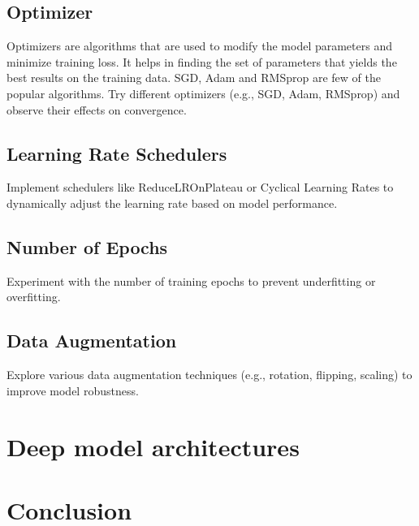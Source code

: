 \documentclass[10pt,twocolumn,letterpaper]{article}
\begin{document}


\subsection{Optimizer}


Optimizers are algorithms that are used to modify the model parameters and minimize training loss. It helps in finding
the set of parameters that yields the best results on the training data. SGD, Adam and RMSprop are few of the popular
algorithms.
Try different optimizers (e.g., SGD, Adam, RMSprop) and observe their effects on convergence.


\subsection{Learning Rate Schedulers}

Implement schedulers like ReduceLROnPlateau or Cyclical Learning Rates to dynamically adjust the learning rate based on model performance.

\subsection{Number of Epochs}

Experiment with the number of training epochs to prevent underfitting or overfitting.

\subsection{Data Augmentation}

Explore various data augmentation techniques (e.g., rotation, flipping, scaling) to improve model robustness.

\section{Deep model architectures}
\label{sec:deep_model_arch}


\section{Conclusion}
\label{sec:conclusion}

{\small
  
  
}
\end{document}
